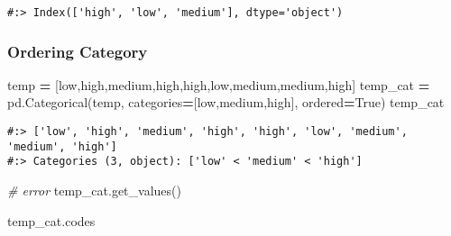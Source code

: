 \documentclass[
]{book}
\newenvironment{Shaded}{\begin{snugshade}}{\end{snugshade}}
\newcommand{\CommentTok}[1]{\textcolor[rgb]{0.37,0.37,0.37}{\textit{#1}}}
\newcommand{\NormalTok}[1]{#1}
\newcommand{\OperatorTok}[1]{\textcolor[rgb]{0.43,0.43,0.43}{\textbf{#1}}}
\newcommand{\StringTok}[1]{\textcolor[rgb]{0.5,0.5,0.5}{#1}}
\newcommand{\VariableTok}[1]{\textcolor[rgb]{0,0,0}{#1}}
\begin{document}
\begin{verbatim}
#:> Index(['high', 'low', 'medium'], dtype='object')
\end{verbatim}

\hypertarget{ordering-category}{%
\subsubsection{Ordering Category}\label{ordering-category}}

\begin{Shaded}
\begin{Highlighting}[]
\NormalTok{temp }\OperatorTok{=}\NormalTok{ [}\StringTok{\textquotesingle{}low\textquotesingle{}}\NormalTok{,}\StringTok{\textquotesingle{}high\textquotesingle{}}\NormalTok{,}\StringTok{\textquotesingle{}medium\textquotesingle{}}\NormalTok{,}\StringTok{\textquotesingle{}high\textquotesingle{}}\NormalTok{,}\StringTok{\textquotesingle{}high\textquotesingle{}}\NormalTok{,}\StringTok{\textquotesingle{}low\textquotesingle{}}\NormalTok{,}\StringTok{\textquotesingle{}medium\textquotesingle{}}\NormalTok{,}\StringTok{\textquotesingle{}medium\textquotesingle{}}\NormalTok{,}\StringTok{\textquotesingle{}high\textquotesingle{}}\NormalTok{]}
\NormalTok{temp\_cat }\OperatorTok{=}\NormalTok{ pd.Categorical(temp, categories}\OperatorTok{=}\NormalTok{[}\StringTok{\textquotesingle{}low\textquotesingle{}}\NormalTok{,}\StringTok{\textquotesingle{}medium\textquotesingle{}}\NormalTok{,}\StringTok{\textquotesingle{}high\textquotesingle{}}\NormalTok{], ordered}\OperatorTok{=}\VariableTok{True}\NormalTok{)}
\NormalTok{temp\_cat}
\end{Highlighting}
\end{Shaded}

\begin{verbatim}
#:> ['low', 'high', 'medium', 'high', 'high', 'low', 'medium', 'medium', 'high']
#:> Categories (3, object): ['low' < 'medium' < 'high']
\end{verbatim}

\begin{Shaded}
\begin{Highlighting}[]
\CommentTok{\# error}
\NormalTok{temp\_cat.get\_values()}
\end{Highlighting}
\end{Shaded}

\begin{Shaded}
\begin{Highlighting}[]
\NormalTok{temp\_cat.codes}
\end{Highlighting}
\end{Shaded}
\end{document}
